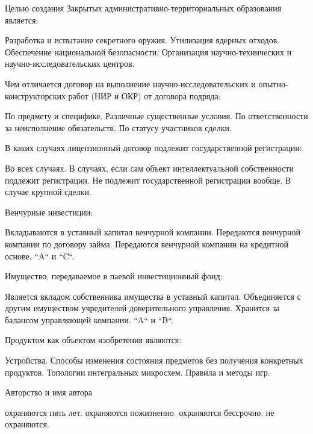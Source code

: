 \documentclass[12pt, table]{exam}
\begin{document}
\begin{questions}
\begin{multicols}{2}
\question Целью создания Закрытых административно-территориальных образования является:
\begin{choices}
	\CC Разработка и испытание секретного оружия.
	\choice Утилизация ядерных отходов.
	\choice Обеспечение национальной безопасности.
	\choice Организация научно-технических и научно-исследовательских центров.
\end{choices}

\question Чем отличается договор на выполнение научно-исследовательских и опытно-конструкторских работ (НИР и ОКР) от договора подряда:
\begin{choices}
	\choice По предмету и специфике.
	\CC Различные существенные условия.
	\choice По ответственности за неисполнение обязательств.
	\choice По статусу участников сделки.
\end{choices}

\question В каких случаях лицензионный договор подлежит государственной регистрации:
\begin{choices}
	\choice Во всех случаях.
	\CC В случаях, если сам объект интеллектуальной собственности подлежит регистрации.
	\choice Не подлежит государственной регистрации вообще.
	\choice В случае крупной сделки.
\end{choices}

\question Венчурные инвестиции:
\begin{choices}
	\CC Вкладываются в уставный капитал венчурной компании. 
	\choice Передаются венчурной компании по договору займа.
	\choice Передаются венчурной компании на кредитной основе.
	\choice ``A`` и ``C``.
\end{choices}

\question Имущество, передаваемое в паевой инвестиционный фонд:
\begin{choices}
	\choice Является вкладом собственника имущества в уставный капитал.
	\choice Объединяется с другим имуществом учредителей доверительного управления.
	\choice Хранится за балансом управляющей компании.
	\CC ``A`` и ``B``.
\end{choices}

\question Продуктом как объектом изобретения являются:
\begin{choices}
	\choice Устройства.
	\choice Способы изменения состояния предметов без получения конкретных продуктов.
	\CC Топологии интегральных микросхем.
	\choice Правила и методы игр.
\end{choices}

\question Авторство и имя автора 
\begin{choices}
	\choice охраняются пять лет.
	\choice охраняются пожизненно.
	\CC охраняются бессрочно.
	\choice не охраняются.
\end{choices}


\end{multicols}
\end{questions}
\end{document}
